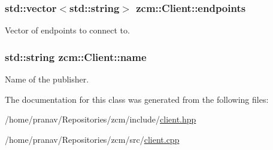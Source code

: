 \subsubsection[{\texorpdfstring{endpoints}{endpoints}}]{\setlength{\rightskip}{0pt plus 5cm}std\+::vector$<$std\+::string$>$ zcm\+::\+Client\+::endpoints\hspace{0.3cm}{\ttfamily [private]}}\hypertarget{classzcm_1_1Client_a01cfee292bb3546a47ec70fff35ff1b6}{}\label{classzcm_1_1Client_a01cfee292bb3546a47ec70fff35ff1b6}


Vector of endpoints to connect to. 

\subsubsection[{\texorpdfstring{name}{name}}]{\setlength{\rightskip}{0pt plus 5cm}std\+::string zcm\+::\+Client\+::name\hspace{0.3cm}{\ttfamily [private]}}\hypertarget{classzcm_1_1Client_ae972b951134774fd2246d802e2bc6fc0}{}\label{classzcm_1_1Client_ae972b951134774fd2246d802e2bc6fc0}


Name of the publisher. 



The documentation for this class was generated from the following files\+:\begin{DoxyCompactItemize}
\item 
/home/pranav/\+Repositories/zcm/include/\hyperlink{client_8hpp}{client.\+hpp}\item 
/home/pranav/\+Repositories/zcm/src/\hyperlink{client_8cpp}{client.\+cpp}\end{DoxyCompactItemize}
